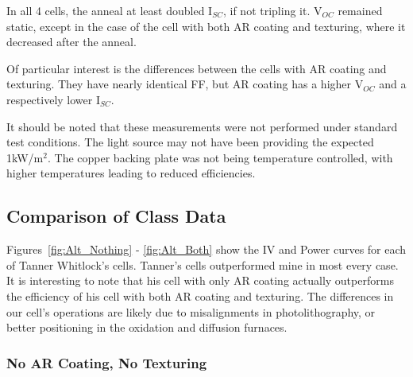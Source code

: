 \documentclass[letter,12pt]{article}
\begin{document}
	In all 4 cells, the anneal at least doubled I$_{SC}$, if not tripling it. V$_{OC}$ remained static, except in the case of the cell with both AR coating and texturing, where it decreased after the anneal.
	
	Of particular interest is the differences between the cells with AR coating and texturing.  They have nearly identical FF, but AR coating has a higher V$_{OC}$ and a respectively lower I$_{SC}$.
	
	It should be noted that these measurements were not performed under standard test conditions. The light source may not have been providing the expected 1kW/m$^2$. The copper backing plate was not being temperature controlled, with higher temperatures leading to reduced efficiencies.
	
	\subsection{Comparison of Class Data}
	Figures~\ref{fig:Alt_Nothing} - \ref{fig:Alt_Both} show the IV and Power curves for each of Tanner Whitlock's cells. Tanner's cells outperformed mine in most every case.  It is interesting to note that his cell with only AR coating actually outperforms the efficiency of his cell with both AR coating and texturing. The differences in our cell's operations are likely due to misalignments in photolithography, or better positioning in the oxidation and diffusion furnaces.
	
	
		\subsubsection{No AR Coating, No Texturing}
		
\end{document}
